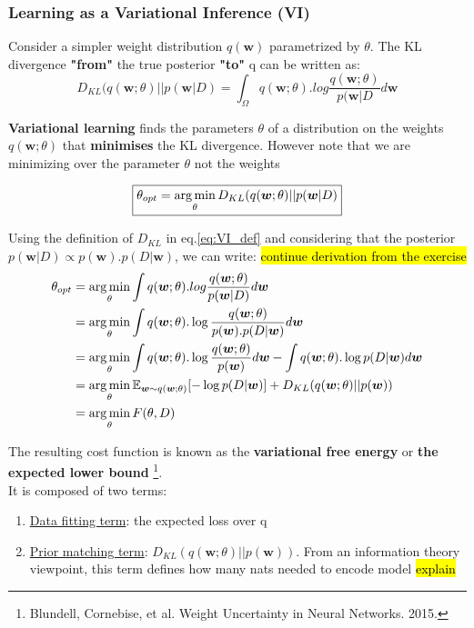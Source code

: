 \documentclass[main]{subfiles}
\begin{document}
\subsubsection{Learning as a Variational Inference (VI)}
Consider a simpler weight distribution $q(\bm{w})$ parametrized by $\theta$. The KL divergence \textbf{"from"} the true posterior\textbf{ "to" }q can be written as:
\begin{equation}
    D_{KL}(q(\bm{w}; \theta)||p(\bm{w} |D) = \int_\Omega q(\bm{w};\theta) . log \frac{q(\bm{w};\theta)}{p(\bm{w}|D} d\bm{w}
\end{equation}

\noindent
\textbf{Variational learning} finds the parameters $\theta$ of a distribution on the weights $q(\bm{w};\theta)$ that \textbf{minimises} the KL divergence. However note that we are minimizing over the parameter $\theta$ not the weights


\begin{equation}
\boxed{
    \theta_{opt} = \operatorname*{arg\,min}_\theta D_{KL}(q(\bm{w}; \theta)||p(\bm{w} |D)
    }
    \label{eq:VI_def}
\end{equation}

Using the definition of $D_{KL}$ in eq.\ref{eq:VI_def} and considering that the posterior $p(\bm{w}|D) \propto p(\bm{w}). p(D|\bm{w})$, we can write: \hl{continue derivation from the exercise}
\begin{equation}
    \begin{split}
        \theta_{opt} &= \operatorname*{arg\,min}_\theta \int q(\bm{w};\theta) . log \frac{q(\bm{w};\theta)}{p(\bm{w}|D)} d\bm{w}\\
        &= \operatorname*{arg\,min}_\theta \int q(\bm{w};\theta) . \log \frac{q(\bm{w};\theta)}{p(\bm{w}). p(D|\bm{w})} d\bm{w}\\
        &= \operatorname*{arg\,min}_\theta \int q(\bm{w};\theta). \log \frac{q(\bm{w};\theta)}{p(\bm{w})}  d\bm{w} - \int q(\bm{w};\theta).\log p(D|\bm{w})d\bm{w}\\
        &= \operatorname*{arg\,min}_\theta \operatorname{\mathbb{E}}_{\bm{w} \sim q(\bm{w};\theta)} [-\log p(D|\bm{w})] + D_{KL}(q(\bm{w}; \theta)||p(\bm{w}))\\
        &= \operatorname*{arg\,min}_\theta F(\theta, D)
    \end{split}
    \label{eq:VI_opt}
\end{equation}

\noindent The resulting cost function is known as the \textbf{variational free energy} or \textbf{the expected lower bound} \footnote{Blundell, Cornebise, et al. Weight Uncertainty in Neural Networks. 2015.}. \\It is composed of two terms:
\begin{enumerate}
    \item \underline{Data fitting term}: the expected loss over q
    \item \underline{Prior matching term}: $D_{KL}(q(\bm{w}; \theta)||p(\bm{w}))$. From an information theory viewpoint, this term defines how many nats needed to encode model \hl{explain}
\end{enumerate}
\end{document}
